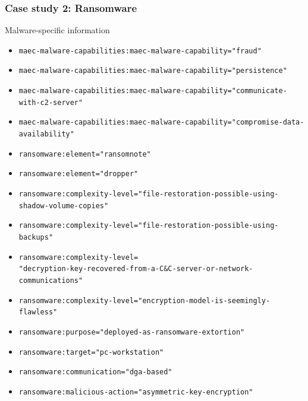 \begin{frame}
    \frametitle{Case study 2: Ransomware}
    Malware-specific information
    \begin{itemize}
        \item \texttt{\scriptsize maec-malware-capabilities:maec-malware-capability="fraud"}
        \item \texttt{\tiny maec-malware-capabilities:maec-malware-capability="persistence"}
        \item \texttt{\tiny maec-malware-capabilities:maec-malware-capability="communicate-with-c2-server"}
        \item \texttt{\tiny maec-malware-capabilities:maec-malware-capability="compromise-data-availability"}
        \item \texttt{\scriptsize ransomware:element="ransomnote"}
        \item \texttt{\scriptsize ransomware:element="dropper"}
        \item \texttt{\tiny ransomware:complexity-level="file-restoration-possible-using-shadow-volume-copies"}
        \item \texttt{\tiny ransomware:complexity-level="file-restoration-possible-using-backups"}
        \item \texttt{\tiny ransomware:complexity-level=\\ "decryption-key-recovered-from-a-C\&C-server-or-network-communications"}
        \item \texttt{\tiny ransomware:complexity-level="encryption-model-is-seemingly-flawless"}
        \item \texttt{\scriptsize ransomware:purpose="deployed-as-ransomware-extortion"}
        \item \texttt{\scriptsize ransomware:target="pc-workstation"}
        \item \texttt{\scriptsize ransomware:communication="dga-based"}
        \item \texttt{\scriptsize ransomware:malicious-action="asymmetric-key-encryption"}
    \end{itemize}
\end{frame}

